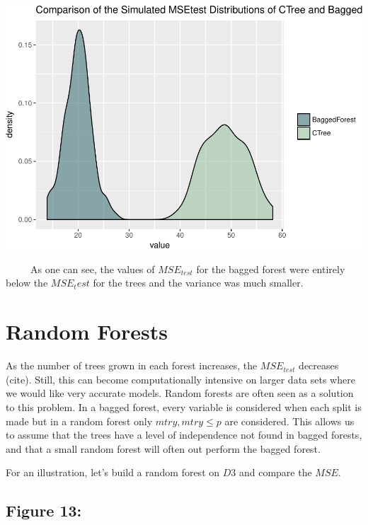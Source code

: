 \documentclass[12pt,twoside]{reedthesis}
\begin{document}
  \begin{center}\includegraphics{Thesis_files/figure-latex/fig12-1} \end{center}
  
  ~~~~~As one can see, the values of \(MSE_{test}\) for the bagged forest
  were entirely below the \(MSE_test\) for the trees and the variance was
  much smaller.
  
  \section{Random Forests}\label{random-forests}
  
  As the number of trees grown in each forest increases, the
  \(MSE_{test}\) decreases (cite). Still, this can become computationally
  intensive on larger data sets where we would like very accurate models.
  Random forests are often seen as a solution to this problem. In a bagged
  forest, every variable is considered when each split is made but in a
  random forest only \(mtry, mtry \leq p\) are considered. This allows us
  to assume that the trees have a level of independence not found in
  bagged forests, and that a small random forest will often out perform
  the bagged forest.
  
  For an illustration, let's build a random forest on \(D3\) and compare
  the \(MSE\).
  
  \subsection{Figure 13:}\label{figure-13}
  
\end{document}

